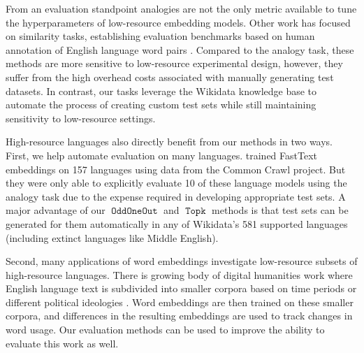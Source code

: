 \documentclass[11pt,a4paper]{article}
\DeclareMathOperator{\OddOneOut}{\texttt{OddOneOut}}
\DeclareMathOperator{\topk}{\texttt{Topk}}
\begin{document}
From an evaluation standpoint analogies are not the only metric available to tune the hyperparameters of low-resource embedding models.
Other work has focused on similarity tasks, establishing evaluation benchmarks based on human annotation of English language word pairs \cite{finkelstein2001placing,radinsky2011word,bruni2012distributional}.
 Compared to the analogy task,
 these methods are more sensitive to low-resource experimental design,
however, they suffer from the high overhead costs associated with manually generating test datasets. In contrast, our tasks leverage the Wikidata knowledge base to automate the process of creating custom test sets while still maintaining sensitivity to low-resource settings.


High-resource languages also directly benefit from our methods in two ways.
First, we help automate evaluation on many languages.
\citet{grave2018learning} trained FastText embeddings on 157 languages using data from the Common Crawl project.
But they were only able to explicitly evaluate 10 of these language models using the analogy task due to the expense required in developing appropriate test sets.
A major advantage of our $\OddOneOut$ and $\topk$ methods is that test sets can be generated for them automatically in any of Wikidata's 581 supported languages (including extinct languages like Middle English).%

Second, many applications of word embeddings investigate low-resource subsets of high-resource languages.
There is growing body of digital humanities work where English language text is subdivided into smaller corpora based on time periods \cite[e.g.][]{kulkarni2015statistically,hamilton2016diachronic,hamilton2016cultural,dubossarsky2017outta,szymanski2017temporal,chen2017understanding,liang2018dynamic,tang2018state,kutuzov2018diachronic,kozlowski2019geometry}
or different political ideologies \citet{azarbonyad2017words}.
Word embeddings are then trained on these smaller corpora,
and differences in the resulting embeddings are used to track changes in word usage.
Our evaluation methods can be used to improve the ability to evaluate this work as well.
\end{document}
